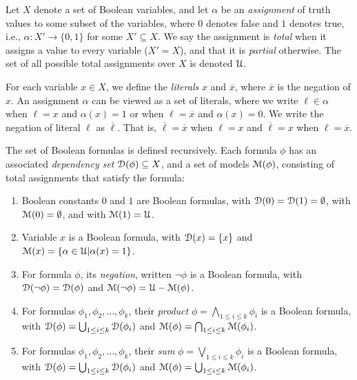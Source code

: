 \documentclass[letterpaper,USenglish,cleveref, autoref, thm-restate]{lipics-v2021}
\newcommand{\boolnot}{\neg}
\newcommand{\obar}[1]{\overline{#1}}
\newcommand{\lit}{\ell}
\newcommand{\varset}{X}
\newcommand{\dependencyset}{{\cal D}}
\newcommand{\assign}{\alpha}
\newcommand{\uassign}{{\cal U}}
\newcommand{\modelset}{{\cal M}}
\begin{document}
  Let $\varset$ denote a set of Boolean variables, and let $\assign$
  be an \emph{assignment} of truth values to some subset of the
  variables, where $0$ denotes false and $1$ denotes true, i.e.,
  $\assign \colon \varset' \rightarrow \{0,1\}$ for some $\varset'
  \subseteq \varset$.  We say the assignment is \emph{total} when it
  assigns a value to every variable ($\varset' = \varset$), and that
  it is \emph{partial} otherwise.
  The set of all possible total assignments over
  $\varset$ is denoted $\uassign$.

For each variable $x \in \varset$,
  we define the \emph{literals} $x$ and $\obar{x}$, where $\obar{x}$ is the
  negation of $x$. An
  assignment $\assign$ can be viewed as a set of literals, where
  we write $\lit \in \assign$ when $\lit = x$ and $\assign(x) = 1$ or when
  $\lit = \obar{x}$ and $\assign(x) = 0$.  We write the negation of literal $\lit$ as $\obar{\lit}$.  That is, $\obar{\lit} = \obar{x}$ when $\lit = x$ and
$\obar{\lit} = x$ when $\lit = \obar{x}$.


\begin{definition}
  The set of Boolean formulas is defined recursively.  Each
  formula $\phi$ has an associated \emph{dependency set}
  $\dependencyset(\phi)  \subseteq \varset$, and a set of models $\modelset(\phi)$,
  consisting of total assignments that satisfy the formula:
  \begin{enumerate}
  \item Boolean constants $0$ and $1$ are Boolean formulas,
    with $\dependencyset(0) = \dependencyset(1) = \emptyset$, with $\modelset(0) = \emptyset$, and with $\modelset(1) = \uassign$.
  \item Variable $x$ is a Boolean formula, with $\dependencyset(x) = \{x\}$
    and $\modelset(x) = \{\assign \in \uassign | \assign(x)=1\}$.
  \item For formula $\phi$, its \emph{negation}, written $\boolnot \phi$ is a Boolean formula,
    with $\dependencyset(\boolnot \phi) = \dependencyset(\phi)$ and $\modelset(\boolnot \phi) = \uassign - \modelset(\phi)$.
  \item For formulas $\phi_1, \phi_2, \ldots, \phi_k$, their \emph{product} $\phi = \bigwedge_{1 \leq i \leq k} \phi_i$ is a Boolean formula, with
      $\dependencyset(\phi) = \bigcup_{1 \leq i \leq k} \dependencyset(\phi_i)$ and
      $\modelset(\phi) = \bigcap_{1 \leq i \leq k} \modelset(\phi_i)$.
  \item For formulas $\phi_1, \phi_2, \ldots, \phi_k$, their \emph{sum} $\phi = \bigvee_{1 \leq i \leq k} \phi_i$ is a Boolean formula, with
      $\dependencyset(\phi) = \bigcup_{1 \leq i \leq k} \dependencyset(\phi_i)$ and
      $\modelset(\phi) = \bigcup_{1 \leq i \leq k} \modelset(\phi_i)$.
  \end{enumerate}
\label{def:boolean}
\end{definition}
\end{document}
